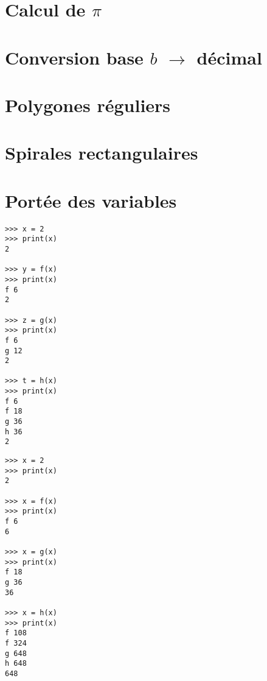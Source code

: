 \documentclass[11pt,a4paper]{article}
\begin{document}

\section{Calcul de $\pi$}


\section{Conversion base $b$ $\rightarrow$ décimal}


\section{Polygones réguliers}


\section{Spirales rectangulaires}


\section{Portée des variables}
%

\begin{minipage}[t]{7cm}\footnotesize
\begin{verbatim}
>>> x = 2
>>> print(x)
2

>>> y = f(x)
>>> print(x)
f 6
2

>>> z = g(x)
>>> print(x)
f 6
g 12
2

>>> t = h(x)
>>> print(x)
f 6
f 18
g 36
h 36
2
\end{verbatim}
\end{minipage}
\hfill
\begin{minipage}[t]{7cm}\footnotesize
\begin{verbatim}
>>> x = 2
>>> print(x)
2

>>> x = f(x)
>>> print(x)
f 6
6

>>> x = g(x)
>>> print(x)
f 18
g 36
36

>>> x = h(x)
>>> print(x)
f 108
f 324
g 648
h 648
648
\end{verbatim}
\end{minipage}
\end{document}
